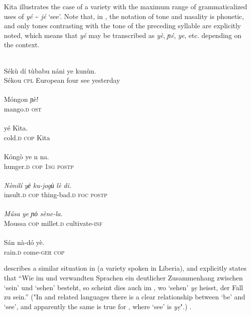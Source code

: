 \documentclass[output=paper]{langsci/langscibook}
\begin{document}
Kita  illustrates the case of a  variety with the maximum range of grammaticalized uses of \textit{yé} {\textasciitilde} \textit{jé} ‘see’. Note that, in , the notation of tone and nasality is phonetic, and only tones contrasting with the tone of the preceding syllable are explicitly noted, which means that \textit{yé} may be transcribed as \textit{yè}, \textit{ɲé}, \textit{ye}, etc. depending on the context.

\ea
    \label{ex:creissels:6}
    \citep[19, 78, 79, 87, 88]{Creissels2009}\\  
   \ea
    \gll   Sékù  dí  tùbabu  náni  ye  kunùn.\\
      Sékou  \textsc{cpl}  European  four  see  yesterday\\
      \\
   \ex
    \gll   Móngon  ɲè!\\
      mango.\textsc{d}  \textsc{ost}\\
      \\
   \ex
    {yé}  {Kìta.}\\
           cold.\textsc{d}  \textsc{cop}  Kita\\
      \\
   \ex
    \gll   Kóngò  ye  n  na.\\
      hunger.\textsc{d}  \textsc{cop}  \textsc{1sg}   \textsc{postp} \\
      \\
   \ex
  \gll \textit{Nònilí}  \textit{ye̍}  \textit{ku-jogu̍}  \textit{lè}  \textit{di.}\\
        insult.\textsc{d}  \textsc{cop}  thing-bad.\textsc{d}  \textsc{foc}   \textsc{postp} \\
      \\
  \ex 
  \gll \textit{Músa}  \textit{ye}  \textit{ɲo̍}  \textit{sène-la.}\\
   Moussa  \textsc{cop}  millet.\textsc{d}  cultivate-\textsc{inf}\\   
      \\ 
   \ex
    \gll   Sán  nà-dó  yè.\\
      rain.\textsc{d}  come-\textsc{ger}  \textsc{cop}\\
\z
\z


\citet{Heydorn1949-1950} describes a similar situation in  (a  variety spoken in Liberia), and explicitly states that “Wie im  und verwandten Sprachen ein deutlicher Zusammenhang zwischen ‘sein’ und ‘sehen’ besteht, so scheint dies auch im , wo ‘sehen’ \textit{ye̦} heisst, der Fall zu sein.” ("In  and related languages there is a clear relationship between ‘be’ and ‘see’, and apparently the same is true for , where ‘see’ is \textit{ye}̣".) \citep[57]{Heydorn1949-1950}.
\end{document}
